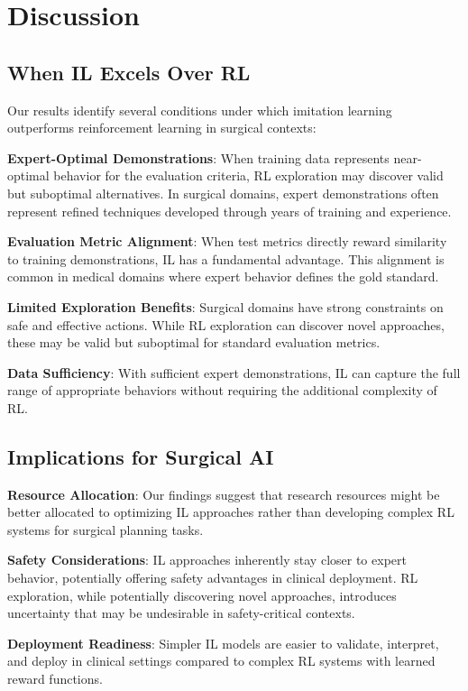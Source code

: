 
\section{Discussion}

\subsection{When IL Excels Over RL}

Our results identify several conditions under which imitation learning outperforms reinforcement learning in surgical contexts:

\textbf{Expert-Optimal Demonstrations}: When training data represents near-optimal behavior for the evaluation criteria, RL exploration may discover valid but suboptimal alternatives. In surgical domains, expert demonstrations often represent refined techniques developed through years of training and experience.

\textbf{Evaluation Metric Alignment}: When test metrics directly reward similarity to training demonstrations, IL has a fundamental advantage. This alignment is common in medical domains where expert behavior defines the gold standard.

\textbf{Limited Exploration Benefits}: Surgical domains have strong constraints on safe and effective actions. While RL exploration can discover novel approaches, these may be valid but suboptimal for standard evaluation metrics.

\textbf{Data Sufficiency}: With sufficient expert demonstrations, IL can capture the full range of appropriate behaviors without requiring the additional complexity of RL.

\subsection{Implications for Surgical AI}

\textbf{Resource Allocation}: Our findings suggest that research resources might be better allocated to optimizing IL approaches rather than developing complex RL systems for surgical planning tasks.

\textbf{Safety Considerations}: IL approaches inherently stay closer to expert behavior, potentially offering safety advantages in clinical deployment. RL exploration, while potentially discovering novel approaches, introduces uncertainty that may be undesirable in safety-critical contexts.

\textbf{Deployment Readiness}: Simpler IL models are easier to validate, interpret, and deploy in clinical settings compared to complex RL systems with learned reward functions.

